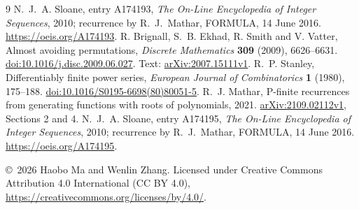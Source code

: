 \documentclass[10pt]{article}
\begin{document}
\begin{thebibliography}{9}
 N.\ J.\ A. Sloane, entry A174193, \emph{The On-Line
Encyclopedia of Integer Sequences}, 2010; recurrence by R.\ J.\ Mathar,
FORMULA, 14 June 2016. \url{https://oeis.org/A174193}.
 R. Brignall, S.\ B. Ekhad, R. Smith and V. Vatter,
Almost avoiding permutations, \emph{Discrete Mathematics} \textbf{309}
(2009), 6626--6631. \href{https://doi.org/10.1016/j.disc.2009.06.027}{doi:10.1016/j.disc.2009.06.027}.
Text: \href{https://arxiv.org/abs/2007.15111v1}{arXiv:2007.15111v1}.
 R.\ P. Stanley, Differentiably finite power series,
\emph{European Journal of Combinatorics} \textbf{1} (1980), 175--188.
\href{https://doi.org/10.1016/S0195-6698(80)80051-5}{doi:10.1016/S0195-6698(80)80051-5}.
 R.\ J. Mathar, P-finite recurrences from generating
functions with roots of polynomials, 2021.
\href{https://arxiv.org/abs/2109.02112v1}{arXiv:2109.02112v1}, Sections 2 and 4.
 N.\ J.\ A. Sloane, entry A174195, \emph{The On-Line
Encyclopedia of Integer Sequences}, 2010; recurrence by R.\ J.\ Mathar,
FORMULA, 14 June 2016. \url{https://oeis.org/A174195}.
\end{thebibliography}
\noindent\small \copyright\ 2026 Haobo Ma and Wenlin Zhang.
Licensed under Creative Commons Attribution 4.0 International (CC BY 4.0),
\url{https://creativecommons.org/licenses/by/4.0/}.
\end{document}

